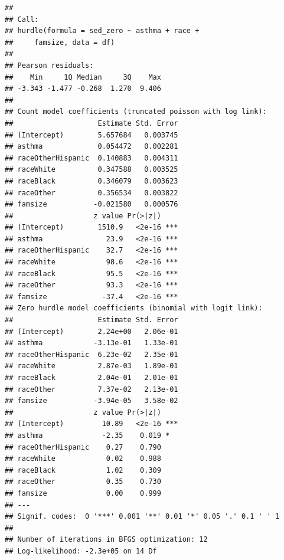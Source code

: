 \documentclass[]{tufte-book}
\newenvironment{Shaded}{}{}
\newcommand{\KeywordTok}[1]{\textcolor[rgb]{0.00,0.44,0.13}{\textbf{#1}}}
\newcommand{\DataTypeTok}[1]{\textcolor[rgb]{0.56,0.13,0.00}{#1}}
\newcommand{\DecValTok}[1]{\textcolor[rgb]{0.25,0.63,0.44}{#1}}
\newcommand{\StringTok}[1]{\textcolor[rgb]{0.25,0.44,0.63}{#1}}
\newcommand{\OtherTok}[1]{\textcolor[rgb]{0.00,0.44,0.13}{#1}}
\newcommand{\OperatorTok}[1]{\textcolor[rgb]{0.40,0.40,0.40}{#1}}
\newcommand{\NormalTok}[1]{#1}
\theoremstyle{definition}
\theoremstyle{definition}
\theoremstyle{remark}
\begin{document}
\begin{Shaded}
\end{Shaded}

\begin{verbatim}
## 
## Call:
## hurdle(formula = sed_zero ~ asthma + race + 
##     famsize, data = df)
## 
## Pearson residuals:
##    Min     1Q Median     3Q    Max 
## -3.343 -1.477 -0.268  1.270  9.406 
## 
## Count model coefficients (truncated poisson with log link):
##                    Estimate Std. Error
## (Intercept)        5.657684   0.003745
## asthma             0.054472   0.002281
## raceOtherHispanic  0.140883   0.004311
## raceWhite          0.347588   0.003525
## raceBlack          0.346079   0.003623
## raceOther          0.356534   0.003822
## famsize           -0.021580   0.000576
##                   z value Pr(>|z|)    
## (Intercept)        1510.9   <2e-16 ***
## asthma               23.9   <2e-16 ***
## raceOtherHispanic    32.7   <2e-16 ***
## raceWhite            98.6   <2e-16 ***
## raceBlack            95.5   <2e-16 ***
## raceOther            93.3   <2e-16 ***
## famsize             -37.4   <2e-16 ***
## Zero hurdle model coefficients (binomial with logit link):
##                    Estimate Std. Error
## (Intercept)        2.24e+00   2.06e-01
## asthma            -3.13e-01   1.33e-01
## raceOtherHispanic  6.23e-02   2.35e-01
## raceWhite          2.87e-03   1.89e-01
## raceBlack          2.04e-01   2.01e-01
## raceOther          7.37e-02   2.13e-01
## famsize           -3.94e-05   3.58e-02
##                   z value Pr(>|z|)    
## (Intercept)         10.89   <2e-16 ***
## asthma              -2.35    0.019 *  
## raceOtherHispanic    0.27    0.790    
## raceWhite            0.02    0.988    
## raceBlack            1.02    0.309    
## raceOther            0.35    0.730    
## famsize              0.00    0.999    
## ---
## Signif. codes:  0 '***' 0.001 '**' 0.01 '*' 0.05 '.' 0.1 ' ' 1 
## 
## Number of iterations in BFGS optimization: 12 
## Log-likelihood: -2.3e+05 on 14 Df
\end{verbatim}
\end{document}
